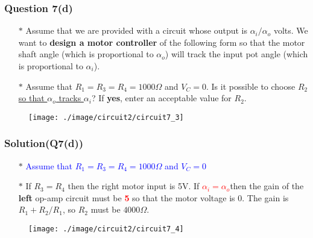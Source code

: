 \documentclass{beamer}
\newcommand{\blue}[1]{\textcolor{blue}{#1}}
\newcommand{\red}[1]{\textcolor{red}{#1}}
\begin{document}
\begin{frame}
\frametitle{Question 7(d)}
\begin{itemize} \itemsep2pt \parskip0pt 
  \item[$\ast$] Assume that we are provided with a circuit whose output is $\alpha_i/\alpha_o$ volts. We want to {\bf design a motor controller} of the following form so that the motor shaft angle (which is proportional to $\alpha_o$) will track the input pot angle (which is proportional to $\alpha_i$).
  \item[$\ast$] Assume that $R_1 = R_3 = R_4 = 1000\Omega$ and $V_C = 0$. Is it possible to choose $R_2$ \underline{so that $\alpha_o$ tracks $\alpha_i$}? If {\bf yes}, enter an acceptable value for $R_2$.
\end{itemize}


\begin{figure}[H]
  \centering
  \texttt{[image: ./image/circuit2/circuit7\_3]}
\end{figure}

\end{frame}


\begin{frame}
\frametitle{Solution(Q7(d))}
\begin{itemize} \itemsep2pt \parskip0pt 
  \item[$\ast$] \blue{Assume that $R_1 = R_3 = R_4 = 1000\Omega$ and $V_C = 0$}
  \item[$\ast$] If $R_3 = R_4$ then the right motor input is 5V. If \red{$\alpha_i = \alpha_o$}then the gain of the {\bf left} op-amp circuit must be \red{\bf 5} so that the motor voltage is 0. The gain is $R_1 + R_2/R_1$, so $R_2$ must be $4000\Omega$.
\end{itemize}


\begin{figure}[H]
  \centering
  \texttt{[image: ./image/circuit2/circuit7\_4]}
\end{figure}

\end{frame}

\end{document}
